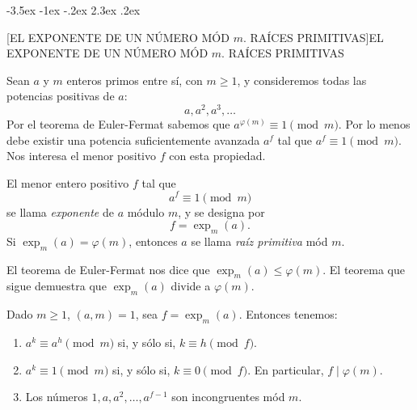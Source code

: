\documentclass[12pt,a4paper]{book}
\makeatletter
\renewcommand\section{\@startsection{section}{1}{\z@}%
  {-3.5ex \@plus -1ex \@minus -.2ex}%
  {2.3ex \@plus .2ex}%
  {\normalfont\Large\bfseries\raggedright}}
\makeatother
\begin{document}
    \section[EL EXPONENTE DE UN NÚMERO MÓD \texorpdfstring{$m$}{m}. RAÍCES PRIMITIVAS]{EL EXPONENTE DE UN NÚMERO MÓD \texorpdfstring{$m$}{m}. RAÍCES PRIMITIVAS}\label{sim:exp}

    Sean $a$ y $m$ enteros primos entre sí, con $m\geq1$, y consideremos todas las potencias
    positivas de $a$:
    \begin{equation*}
        a,a^{2},a^{3},\dots
    \end{equation*}
    Por el teorema de Euler-Fermat sabemos que $a^{\varphi(m)}\equiv1\pmod{m}$. Por lo menos
    debe existir una potencia suficientemente avanzada $a^{f}$ tal que $a^{f}\equiv1\pmod{m}$.
    Nos interesa el menor positivo $f$ con esta propiedad.

    \begin{definicion}
        El menor entero positivo $f$ tal que
        \begin{equation*}
            a^{f}\equiv1\pmod{m}
        \end{equation*}
        se llama \textit{exponente} de $a$ módulo $m$, y se designa por
        \begin{equation*}
            f=\exp_{m}(a).
        \end{equation*}
        Si $\exp_{m}(a)=\varphi(m)$, entonces $a$ se llama \textit{raíz primitiva} mód $m$.
    \end{definicion}

    El teorema de Euler-Fermat nos dice que $\exp_{m}(a)\leq\varphi(m)$. El teorema que sigue
    demuestra que $\exp_{m}(a)$ divide a $\varphi(m)$.

    \begin{teorema}\label{teo:10-1}
        Dado $m\geq1$, $(a,m)=1$, sea $f=\exp_{m}(a)$. Entonces tenemos:
        \begin{enumerate}
            \item[(a)] $a^{k}\equiv a^{h}\pmod{m}$ si, y sólo si, $k\equiv h\pmod{f}$.
            \item[(b)] $a^{k}\equiv1\pmod{m}$ si, y sólo si, $k\equiv0\pmod{f}$. En particular,
            $f\mid\varphi(m)$.
            \item[(c)] Los números $1,a,a^{2},\dots,a^{f-1}$ son incongruentes mód $m$.
        \end{enumerate}
    \end{teorema}
\end{document}
